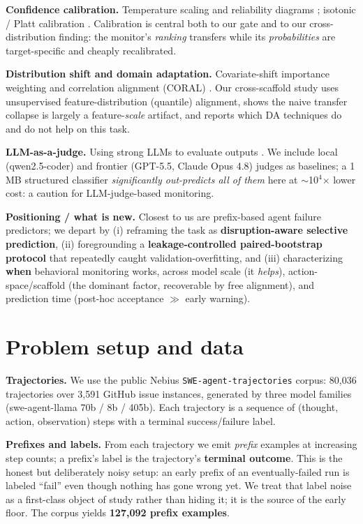 \textbf{Confidence calibration.} Temperature scaling and reliability diagrams \citep{guo2017calibration}; isotonic / Platt calibration \citep{zadrozny2002transforming}. Calibration is central both to our gate and to our cross-distribution finding: the monitor's \emph{ranking} transfers while its \emph{probabilities} are target-specific and cheaply recalibrated.

\textbf{Distribution shift and domain adaptation.} Covariate-shift importance weighting \citep{shimodaira2000improving} and correlation alignment (CORAL) \citep{sun2016return}. Our cross-scaffold study uses unsupervised feature-distribution (quantile) alignment, shows the naive transfer collapse is largely a feature-\emph{scale} artifact, and reports which DA techniques do and do not help on this task.

\textbf{LLM-as-a-judge.} Using strong LLMs to evaluate outputs \citep{zheng2023judging}. We include local (qwen2.5-coder) and frontier (GPT-5.5, Claude Opus 4.8) judges as baselines; a 1 MB structured classifier \emph{significantly out-predicts all of them} here at $\sim$10$^4$$\times$ lower cost: a caution for LLM-judge-based monitoring.

\textbf{Positioning / what is new.} Closest to us are prefix-based agent failure predictors; we depart by (i) reframing the task as \textbf{disruption-aware selective prediction}, (ii) foregrounding a \textbf{leakage-controlled paired-bootstrap protocol} that repeatedly caught validation-overfitting, and (iii) characterizing \textbf{when} behavioral monitoring works, across model scale (it \emph{helps}), action-space/scaffold (the dominant factor, recoverable by free alignment), and prediction time (post-hoc acceptance $\gg$ early warning).

\section{Problem setup and data}
\textbf{Trajectories.} We use the public Nebius \texttt{SWE-agent-trajectories} corpus: 80,036 trajectories over 3,591 GitHub issue instances, generated by three model families (swe-agent-llama 70b / 8b / 405b). Each trajectory is a sequence of (thought, action, observation) steps with a terminal success/failure label.

\textbf{Prefixes and labels.} From each trajectory we emit \emph{prefix} examples at increasing step counts; a prefix's label is the trajectory's \textbf{terminal outcome}. This is the honest but deliberately noisy setup: an early prefix of an eventually-failed run is labeled ``fail'' even though nothing has gone wrong yet. We treat that label noise as a first-class object of study rather than hiding it; it is the source of the early floor. The corpus yields \textbf{127,092 prefix examples}.

